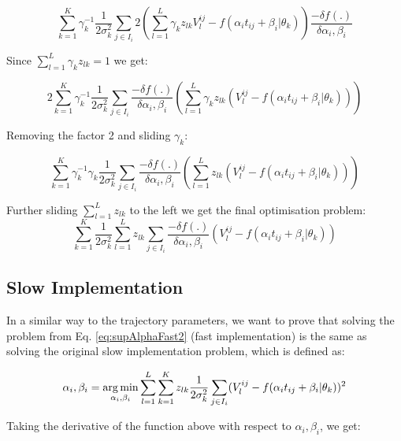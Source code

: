 \begin{equation}
 \sum_{k=1}^K \gamma_k^{-1} \frac{1}{2\sigma_k^2} \sum_{j \in I_i} 2 \left( \sum_{l=1}^L \gamma_k z_{lk} V_l^{ij} - f(\alpha_i t_{ij} + \beta_i | \theta_k) \right) \frac{-\delta f(.)}{\delta \alpha_i, \beta_i}
\end{equation}

Since $ \sum_{l=1}^L \gamma_k z_{lk} = 1$ we get:

\begin{equation}
 2 \sum_{k=1}^K \gamma_k^{-1} \frac{1}{2\sigma_k^2} \sum_{j \in I_i} \frac{-\delta f(.)}{\delta \alpha_i, \beta_i}  \left( \sum_{l=1}^L \gamma_k z_{lk} (V_l^{ij} - f(\alpha_i t_{ij} + \beta_i | \theta_k)) \right) 
\end{equation}

Removing the factor 2 and sliding $\gamma_k$:

\begin{equation}
 \sum_{k=1}^K \gamma_k^{-1} \gamma_k \frac{1}{2\sigma_k^2} \sum_{j \in I_i} \frac{-\delta f(.)}{\delta \alpha_i, \beta_i}  \left( \sum_{l=1}^L  z_{lk} (V_l^{ij} - f(\alpha_i t_{ij} + \beta_i | \theta_k)) \right) 
\end{equation}

Further sliding $\sum_{l=1}^L z_{lk}$ to the left we get the final optimisation problem:
\begin{equation}
\label{eq:supAlphaFast2}
 \sum_{k=1}^K  \frac{1}{2\sigma_k^2} \sum_{l=1}^L z_{lk} \sum_{j \in I_i} \frac{- \delta f(.)}{\delta \alpha_i, \beta_i} (V_l^{ij} - f(\alpha_i t_{ij} + \beta_i | \theta_k))
\end{equation}


\subsection{Slow Implementation}

In a similar way to the trajectory parameters, we want to prove that solving the problem from Eq. \ref{eq:supAlphaFast2} (fast implementation) is the same as solving the original slow implementation problem, which is defined as:

\begin{equation}
 \alpha_i, \beta_i = \operatorname*{arg\,min}_{\alpha_i, \beta_i}   \sum_{l=1}^L \sum_{k=1}^K z_{lk} \frac{1}{2\sigma_k^2} \sum_{j \in I_i} (V_l^{ij} - f(\alpha_i t_{ij} + \beta_i | \theta_k))^2
\end{equation}

Taking the derivative of the function above with respect to $\alpha_i, \beta_i$, we get:

